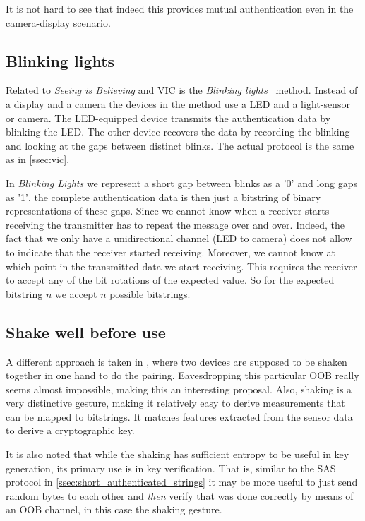 \documentclass[conference, 11pt]{sty/IEEEtran}
\begin{document}
It is not hard to see that indeed this provides mutual authentication even in the camera-display scenario.


\subsection{Blinking lights}
Related to \textit{Seeing is Believing} and VIC is the \textit{Blinking lights}~\cite{saxena2006secure} method.
Instead of a display and a camera the devices in the method use a LED and a light-sensor or camera.
The LED-equipped device transmits the authentication data by blinking the LED.
The other device recovers the data by recording the blinking and looking at the gaps between distinct blinks.
The actual protocol is the same as in \autoref{ssec:vic}.

In \emph{Blinking Lights} we represent a short gap between blinks as a '0' and long gaps as '1', the complete authentication data is then just a bitstring of binary representations of these gaps.
Since we cannot know when a receiver starts receiving the transmitter has to repeat the message over and over.
Indeed, the fact that we only have a unidirectional channel (LED to camera) does not allow to indicate that the receiver started receiving.
Moreover, we cannot know at which point in the transmitted data we start receiving.
This requires the receiver to accept any of the bit rotations of the expected value.
So for the expected bitstring $n$ we accept $n$ possible bitstrings.

\subsection{Shake well before use}
A different approach is taken in \cite{mayrhofer2009shake}, where two devices are supposed to be shaken together in one hand to do the pairing.
Eavesdropping this particular OOB really seems almost impossible, making this an interesting proposal.
Also, shaking is a very distinctive gesture, making it relatively easy to derive measurements that can be mapped to bitstrings.
It matches features extracted from the sensor data to derive a cryptographic key.

It is also noted that while the shaking has sufficient entropy to be useful in key generation, its primary use is in key verification.
That is, similar to the SAS protocol in \autoref{ssec:short_authenticated_strings} it may be more useful to just send random bytes to each other and \emph{then} verify that was done correctly by means of an OOB channel, in this case the shaking gesture.
\end{document}
